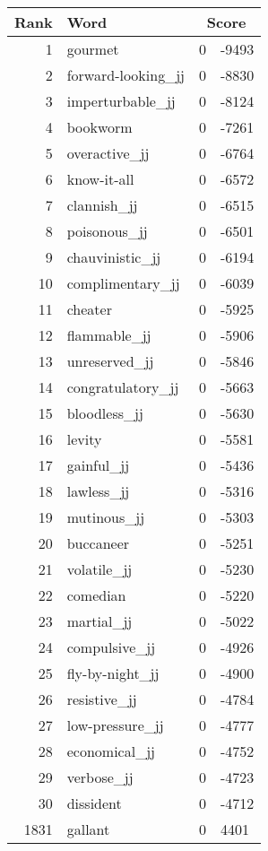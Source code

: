 \begin{longtable}[!htbp]{| rlr@{.}l |}
    \hline
    \textbf{Rank} & \textbf{Word} & \multicolumn{2}{c|}{\textbf{Score}} \\
    \hline
    \endhead
    1 & gourmet & 0 & -9493 \\
    2 & forward-looking\_jj & 0 & -8830 \\
    3 & imperturbable\_jj & 0 & -8124 \\
    4 & bookworm & 0 & -7261 \\
    5 & overactive\_jj & 0 & -6764 \\
    6 & know-it-all & 0 & -6572 \\
    7 & clannish\_jj & 0 & -6515 \\
    8 & poisonous\_jj & 0 & -6501 \\
    9 & chauvinistic\_jj & 0 & -6194 \\
    10 & complimentary\_jj & 0 & -6039 \\
    11 & cheater & 0 & -5925 \\
    12 & flammable\_jj & 0 & -5906 \\
    13 & unreserved\_jj & 0 & -5846 \\
    14 & congratulatory\_jj & 0 & -5663 \\
    15 & bloodless\_jj & 0 & -5630 \\
    16 & levity & 0 & -5581 \\
    17 & gainful\_jj & 0 & -5436 \\
    18 & lawless\_jj & 0 & -5316 \\
    19 & mutinous\_jj & 0 & -5303 \\
    20 & buccaneer & 0 & -5251 \\
    21 & volatile\_jj & 0 & -5230 \\
    22 & comedian & 0 & -5220 \\
    23 & martial\_jj & 0 & -5022 \\
    24 & compulsive\_jj & 0 & -4926 \\
    25 & fly-by-night\_jj & 0 & -4900 \\
    26 & resistive\_jj & 0 & -4784 \\
    27 & low-pressure\_jj & 0 & -4777 \\
    28 & economical\_jj & 0 & -4752 \\
    29 & verbose\_jj & 0 & -4723 \\
    30 & dissident & 0 & -4712 \\
    1831 & gallant & 0 & 4401 \\

\end{longtable}
